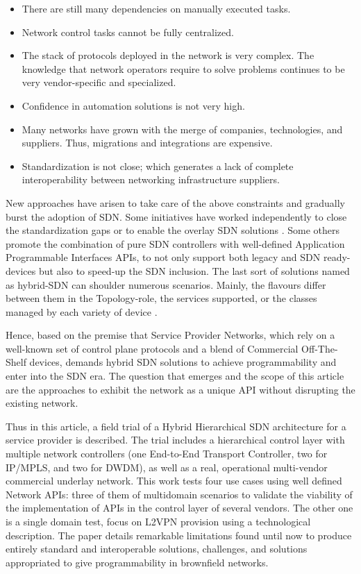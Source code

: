 \documentclass[a4paper,fleqn]{cas-dc}
\begin{document}
\begin{itemize}
    \item There are still many dependencies on manually executed tasks.
    \item Network control tasks cannot be fully centralized.
    \item The stack of protocols deployed in the network is very complex.  The knowledge that network operators require to solve problems continues to be very vendor-specific and specialized.
    \item Confidence in automation solutions is not very high.
    \item Many networks have grown with the merge of companies, technologies, and suppliers. Thus, migrations and integrations are expensive. 
   \item Standardization is not close; which generates a lack of complete interoperability between networking infrastructure suppliers.
\end{itemize}

New approaches have arisen to take care of the above constraints and gradually burst the adoption of SDN. Some initiatives have worked independently to close the standardization gaps or to enable the overlay SDN solutions \cite{bemby2015vino}. Some others promote the combination of pure SDN controllers with well-defined Application Programmable Interfaces APIs, to not only support both legacy and SDN ready-devices but also to speed-up the SDN inclusion. The last sort of solutions named as hybrid-SDN can shoulder numerous scenarios. Mainly, the flavours differ between them in the Topology-role, the services supported, or the classes managed by each variety of device \cite{vissicchio2014opportunities}. 

Hence, based on the premise that Service Provider Networks, which rely on a well-known set of control plane protocols and a blend of Commercial Off-The-Shelf devices, demands hybrid SDN solutions to achieve programmability and enter into the SDN era. The question that emerges and the scope of this article are the approaches to exhibit the network as a unique API without disrupting the existing network. 

Thus in this article, a field trial of a Hybrid Hierarchical SDN architecture for a service provider is described. The trial includes a hierarchical control layer with multiple network controllers (one End-to-End Transport Controller, two for IP/MPLS, and two for DWDM), as well as a real, operational multi-vendor commercial underlay network. This work tests four use cases using well defined Network APIs: three of them of multidomain scenarios to validate the viability of the implementation of APIs in the control layer of several vendors. The other one is a single domain test, focus on L2VPN provision using a technological description. The paper details remarkable limitations found until now to produce entirely standard and interoperable solutions, challenges, and solutions appropriated to give programmability in brownfield networks.
\end{document}
